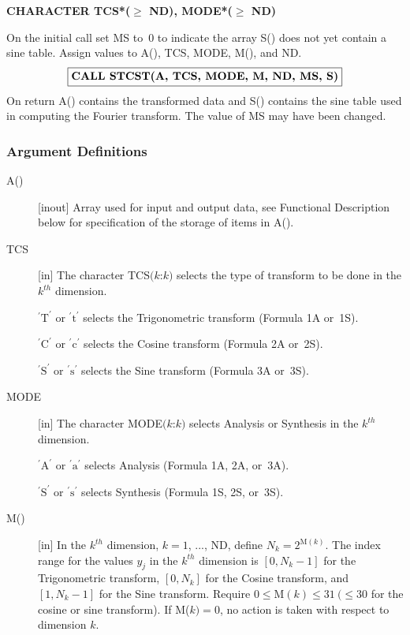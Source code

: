 \documentclass[twoside]{MATH77}
\begin{document}
{\bf CHARACTER TCS*($\geq $ ND), MODE*($\geq $ ND)}

On the initial call set MS to~0 to indicate the array S() does not yet
contain a sine table. Assign values to A(), TCS, MODE, M(), and ND.
$$
\fbox{{\bf CALL STCST(A, TCS, MODE, M, ND, MS, S)}}
$$
On return A() contains the transformed data and S() contains the sine table
used in computing the Fourier transform. The value of MS may have been
changed.

\subsubsection{Argument Definitions}

\begin{description}
\item[A()]  [inout] Array used for input and output data, see Functional
Description below for specification of the storage of items in A().

\item[TCS]  [in] The character TCS$(k$:$k)$ selects the type of transform to
be done in the $k^{th}$ dimension.

$^{\prime }\text{T}^{\prime }$ or $^{\prime }\text{t}^{\prime }$ selects the Trigonometric
transform (Formula 1A or~1S).

$^{\prime }\text{C}^{\prime }$ or $^{\prime }\text{c}^{\prime }$ selects the Cosine
transform (Formula 2A or~2S).

$^{\prime }\text{S}^{\prime }$ or $^{\prime }\text{s}^{\prime }$ selects the Sine
transform (Formula 3A or~3S).

\item[MODE]  [in] The character MODE$(k$:$k)$ selects Analysis or Synthesis
in the $k^{th}$ dimension.

$^{\prime }\text{A}^{\prime }$ or $^{\prime }\text{a}^{\prime }$ selects Analysis (Formula
1A, 2A, or~3A).

$^{\prime }\text{S}^{\prime }$ or $^{\prime }\text{s}^{\prime }$ selects Synthesis
(Formula 1S, 2S, or~3S).

\item[M()]  [in] In the $k^{th}$ dimension, $k=1$, ..., ND, define $%
N_k=2^{\text{M}(k)}$. The index range for the values $y_j$ in the $k^{th}$
dimension is $[0,N_k-1]$ for the Trigonometric transform, $[0,N_k]$ for the
Cosine transform, and $[1,N_k-1]$ for the Sine transform. Require $0 \leq
\text{M}(k)\leq 31\ (\leq 30$ for the cosine or sine transform).  If
M($k)=0$, no action is taken with respect to dimension $k$.


\end{description}
\end{document}
